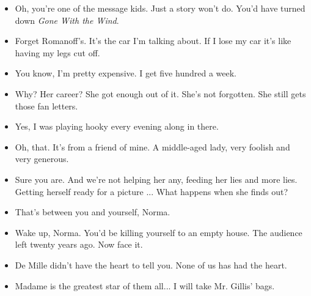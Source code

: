 \documentclass[a4paper]{article}
\begin{document}
\begin{itemize}
\item Oh, you're one of the message kids. Just a story won't do. You'd have turned down \textit{Gone With the Wind}.
\item Forget Romanoff's. It's the car I'm talking about. If I lose my car it's like having my legs cut off.
\item You know, I'm pretty expensive. I get five hundred a week.
\item Why? Her career? She got enough out of it. She's not forgotten. She still gets those fan letters.
\item Yes, I was playing hooky every evening along in there.
\item Oh, that. It's from a friend of mine. A middle-aged lady, very foolish and very generous.
\item Sure you are. And we're not helping her any, feeding her lies and more lies. Getting herself ready for a picture ... What happens when she finds out?
\item That's between you and yourself, Norma.
\item Wake up, Norma. You'd be killing yourself to an empty house. The audience left twenty years ago. Now face it.
\item De Mille didn't have the heart to tell you. None of us has had the heart.
\item Madame is the greatest star of them all... I will take Mr. Gillis' bags.
\end{itemize}
\end{document}
